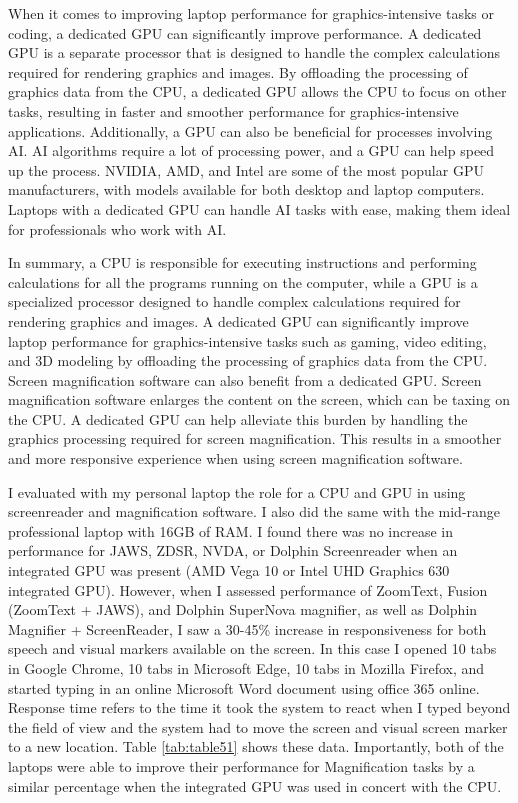 When it comes to improving laptop performance for graphics-intensive tasks or coding, a dedicated GPU can significantly improve performance. A dedicated GPU is a separate processor that is designed to handle the complex calculations required for rendering graphics and images. By offloading the processing of graphics data from the CPU, a dedicated GPU allows the CPU to focus on other tasks, resulting in faster and smoother performance for graphics-intensive applications. Additionally, a GPU can also be beneficial for processes involving AI. AI algorithms require a lot of processing power, and a GPU can help speed up the process. NVIDIA, AMD, and Intel are some of the most popular GPU manufacturers, with models available for both desktop and laptop computers. Laptops with a dedicated GPU can handle AI tasks with ease, making them ideal for professionals who work with AI.

In summary, a CPU is responsible for executing instructions and performing calculations for all the programs running on the computer, while a GPU is a specialized processor designed to handle complex calculations required for rendering graphics and images. A dedicated GPU can significantly improve laptop performance for graphics-intensive tasks such as gaming, video editing, and 3D modeling by offloading the processing of graphics data from the CPU. Screen magnification software can also benefit from a dedicated GPU. Screen magnification software enlarges the content on the screen, which can be taxing on the CPU. A dedicated GPU can help alleviate this burden by handling the graphics processing required for screen magnification. This results in a smoother and more responsive experience when using screen magnification software.

I evaluated with my personal laptop the role for a CPU and GPU in using screenreader and magnification software. I also did the same with the mid-range professional laptop with 16GB of RAM. I found there was no increase in performance for JAWS, ZDSR, NVDA, or Dolphin Screenreader when an integrated GPU was present (AMD Vega 10 or Intel UHD Graphics 630 integrated GPU). However, when I assessed performance of ZoomText, Fusion (ZoomText + JAWS), and Dolphin SuperNova magnifier, as well as Dolphin Magnifier + ScreenReader, I saw a 30-45\% increase in responsiveness for both speech and visual markers available on the screen. In this case I opened 10 tabs in Google Chrome, 10 tabs in Microsoft Edge, 10 tabs in Mozilla Firefox, and started typing in an online Microsoft Word document using office 365 online. Response time refers to the time it took the system to react when I typed beyond the field of view and the system had to move the screen and visual screen marker to a new location. Table \ref{tab:table51} shows these data. Importantly, both of the laptops were able to improve their performance for Magnification tasks by a similar percentage when the integrated GPU was used in concert with the CPU.

